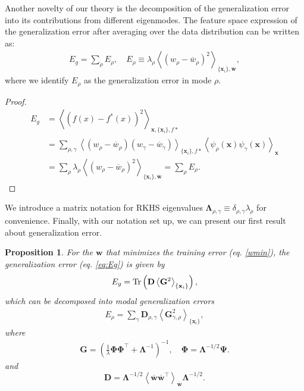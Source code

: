 \documentclass{article}
\newtheorem{proposition}{Proposition}
\begin{document}
Another novelty of our theory is the decomposition of the generalization error into its contributions from different eigenmodes. The feature space expression of the generalization error after averaging over the data distribution can be written as:
%
\begin{align}
E_g = \sum_{\rho}E_{\rho}, \quad E_{\rho} \equiv \lambda_\rho \left< (w_\rho - \overline{w}_\rho)^2 \right>_{\{\mathbf{x}_i\}, \mathbf{\overline w}},
\end{align}
%
where we identify $E_\rho$ as the generalization error in mode $\rho$.
%
 \begin{proof}
 \begin{align}
     \nonumber
     E_g &= \left<(f(x) - f^*(x))^2\right>_{\mathbf{x}, \{ \mathbf{x}_i\}, f*}
     \\
     \nonumber
     &= \sum_{\rho,\gamma} \left< (w_\rho - \overline{w}_\rho)(w_\gamma -\overline{w}_\gamma) \right>_{\{ \mathbf{x}_i\}, f* } \left< \psi_\rho(\mathbf{x}) \psi_\gamma(\mathbf{x}) \right>_{\mathbf{x}}
     \\
     &= \sum_\rho \lambda_\rho  \left< (w_\rho - \overline{w}_\rho)^2 \right>_{\{\mathbf{x}_i\}, \mathbf{\overline w}} = \sum_\rho E_\rho.
 \end{align}
 \end{proof}
%


 We introduce a matrix notation for RKHS eigenvalues $\mathbf{\Lambda}_{\rho,\gamma} \equiv \delta_{\rho,\gamma} \lambda_\rho$ for convenience. Finally, with our notation set up, we can present our first result about generalization error.


\begin{proposition}\label{prop1}
For the $\mathbf{w}$  that minimizes the training error (eq. \eqref{wmin}), %
the generalization error (eq. \eqref{eq:Eg}) is given by
\begin{align}\label{mainEg}
    E_g = {\rm Tr} \left(\mathbf{D} \left< \mathbf{G}^2 \right>_{\{\mathbf{x}_i \}} \right),
\end{align}
%
which can be decomposed into modal generalization errors
%
\begin{align}\label{mainErho}
    E_\rho = \sum_{\gamma} \mathbf{D}_{\rho,\gamma} \left< \mathbf{G}^2_{\gamma,\rho} \right>_{\{\mathbf{x}_i\}},
\end{align}
where 
\begin{align}
    \mathbf{G} = \left (\frac{1}{\lambda} \mathbf{\Phi} \mathbf{\Phi}^\top + \mathbf{\Lambda}^{-1} \right)^{-1},\quad  \mathbf{\Phi} = \mathbf{\Lambda}^{-1/2} \mathbf{\Psi}.
\end{align}
 and 
 \begin{equation}
    \mathbf{D} = \mathbf{\Lambda}^{-1/2} \left< \mathbf{\overline{w}}\mathbf{\overline{w}}^\top \right>_{\mathbf{\overline{w}}} \mathbf{\Lambda}^{-1/2}.
\end{equation}
\end{proposition}
\end{document}
